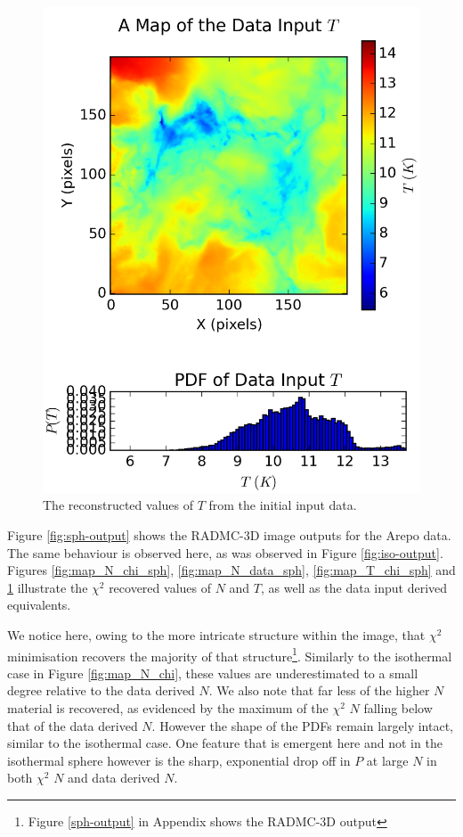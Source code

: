 \documentclass{report}
\begin{document}
\begin{figure}[H]
{\begin{minipage}[b]{0.34\linewidth}
    \includegraphics[width=\linewidth]{../img/sph/map_T_data.png}
    \caption{\protect The reconstructed values of $T$ from the initial input data.}\label{fig:map_T_data_sph}
    \vspace{4ex}
  \end{minipage}}
\end{figure}

Figure \ref{fig:sph-output} shows the RADMC-3D image outputs for the Arepo data. The same behaviour is observed here, as was observed in Figure \ref{fig:iso-output}. Figures \ref{fig:map_N_chi_sph}, \ref{fig:map_N_data_sph},
\ref{fig:map_T_chi_sph} and \ref{fig:map_T_data_sph} illustrate the $\chi^{2}$ recovered values of $N$ and $T$, as well as the data input derived equivalents.

We notice here, owing to the more intricate structure within the image, that $\chi^{2}$ minimisation recovers the majority of that structure\footnote{Figure \ref{sph-output} in Appendix shows the RADMC-3D output}. Similarly to the isothermal case in Figure \ref{fig:map_N_chi}, these values are underestimated to a small degree relative to the data derived $N$. We also note that far less of the higher $N$ material is recovered, as evidenced by the maximum of the $\chi^{2}$ $N$ falling below that of the data derived $N$. However the shape of the PDFs remain largely intact, similar to the isothermal case. One feature that is emergent here and not in the isothermal sphere however is the sharp, exponential drop off in $P$ at large $N$ in both $\chi^{2}$ $N$ and data derived $N$.
\end{document}
